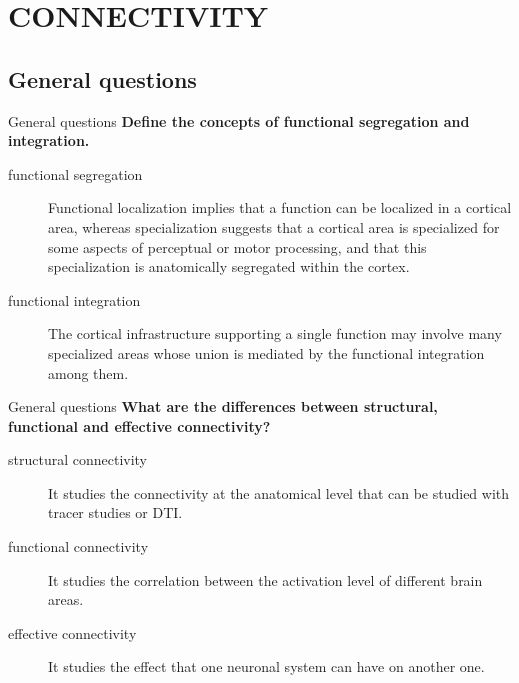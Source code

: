 \documentclass{beamer}
\begin{document}


\section{CONNECTIVITY}


\subsection[General questions]{General questions}


\begin{frame}{General questions}
\textbf{Define the concepts of functional segregation and integration.}

\smallskip
  \begin{description}
    \item[functional segregation] Functional localization implies that a function can be localized in a cortical area, whereas specialization suggests that a cortical area is specialized for some aspects of perceptual or motor processing, and that this specialization is anatomically segregated within the cortex.
    \item [functional integration] The cortical infrastructure supporting a single function may involve many specialized areas whose union is mediated by the functional integration among them.
  \end{description}
\end{frame}


\begin{frame}{General questions}
\textbf{What are the differences between structural, functional and effective connectivity?}

\smallskip
  \begin{description}
    \item [structural connectivity] It studies the connectivity at the anatomical level that can be studied with tracer studies or DTI.
    \item [functional connectivity] It studies the correlation between the activation level of different brain areas.
    \item [effective connectivity] It studies the effect that one neuronal system can have on another one.
  \end{description} 
\end{frame}
\end{document}
